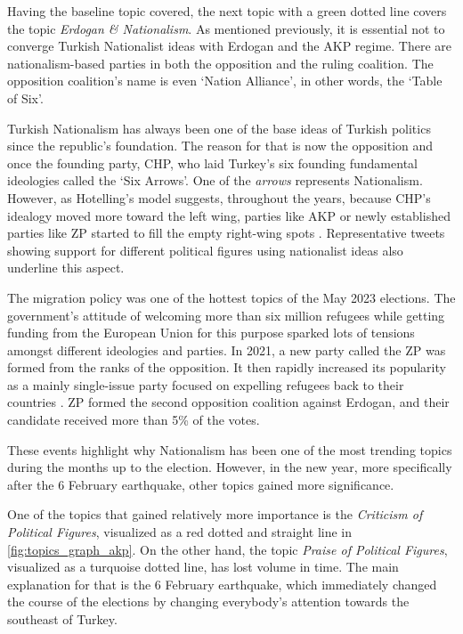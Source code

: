 Having the baseline topic covered, the next topic with a green dotted line covers the topic 
\textit{Erdogan \& Nationalism}. As mentioned previously, it is essential not to converge Turkish 
Nationalist ideas with Erdogan and the AKP regime. There are nationalism-based parties in both the 
opposition and the ruling coalition. The opposition coalition's name is even `Nation Alliance', 
in other words, the `Table of Six'.

Turkish Nationalism has always been one of the base ideas of Turkish politics since the republic's 
foundation. The reason for that is now the opposition and once the founding party, \ac{CHP}, who laid 
Turkey's six founding fundamental ideologies called the `Six Arrows'. 
One of the \textit{arrows} represents Nationalism. However, as Hotelling's model suggests, 
throughout the years, because CHP's idealogy moved more toward the left wing, parties like AKP or 
newly established parties like ZP started to fill the empty right-wing spots \parencite{caramani_comparative_politics_2020}. 
Representative tweets showing support for different political figures using nationalist 
ideas also underline this aspect. 

The migration policy was one of the hottest topics of the May 2023 elections. 
The government's attitude of welcoming more than six million refugees while getting funding from the 
European Union for this purpose sparked lots of tensions amongst different ideologies and parties. 
In 2021, a new party called the \ac{ZP} was formed from the ranks of the opposition. 
It then rapidly increased its popularity as a mainly single-issue party focused on expelling refugees 
back to their countries \parencite{berk_esen_turkish_politics_2023}. \ac{ZP} formed the second opposition 
coalition against Erdogan, and their candidate received more than 5\% of the votes. 

These events highlight why Nationalism has been one of the most trending topics during the months up 
to the election. However, in the new year, more specifically after the 6 February earthquake, other 
topics gained more significance.

One of the topics that gained relatively more importance is the \textit{Criticism of Political Figures}, 
visualized as a red dotted and straight line in \autoref{fig:topics_graph_akp}. On the other hand, 
the topic \textit{Praise of Political Figures}, visualized as a turquoise dotted line, has lost volume 
in time. The main explanation for that is the 6 February earthquake, which immediately changed 
the course of the elections by changing everybody's attention towards the southeast of Turkey. 

